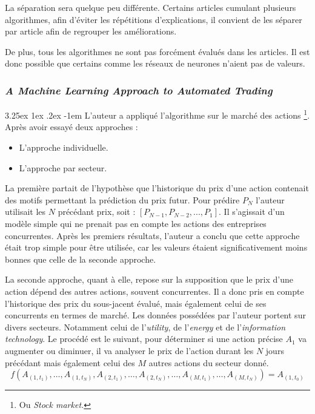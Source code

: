 \documentclass[a4paper, 11pt]{article}
\makeatletter
\newcounter{subsubsubsection}[subsubsection]
\renewcommand\paragraph{\@startsection{paragraph}{5}{\z@}%
  {3.25ex \@plus1ex \@minus.2ex}%
  {-1em}%
  {\normalfont\normalsize\bfseries}}
\makeatother
\begin{document}
La séparation sera quelque peu différente. Certains articles cumulant plusieurs algorithmes, afin d'éviter
les répétitions d'explications, il convient de les séparer par article afin de regrouper les améliorations.

De plus, tous les algorithmes ne sont pas forcément évalués dans les articles. Il est donc possible que certains
comme les réseaux de neurones n'aient pas de valeurs.

\subsubsection{\textit{A Machine Learning Approach to Automated Trading}}

\paragraph{}
L'auteur a appliqué l'algorithme sur le marché des actions \cite{machine_learning_automated_trading}
\footnote{Ou \textit{Stock market.}}. Après avoir essayé deux approches :
\begin{itemize}
\item L'approche individuelle.
\item L'approche par secteur.
\end{itemize}

La première partait de l'hypothèse que l'historique du prix d'une action contenait des motifs permettant la prédiction
du prix futur. Pour prédire $P_N$ l'auteur utilisait les $N$ précédant prix, soit : $[P_{N-1}, P_{N-2},...,P_1]$. Il s'agissait d'un modèle simple qui ne prenait pas en compte les actions des entreprises concurrentes.
Après les premiers résultats, l'auteur a conclu que cette approche
était trop simple pour être utilisée, car les valeurs étaient significativement moins bonnes que celle de la
seconde approche\cite{machine_learning_automated_trading}.

La seconde approche, quant à elle, repose sur la supposition que le prix d'une action dépend des autres actions,
souvent concurrentes. Il a donc pris en compte l'historique des prix du sous-jacent évalué, mais également celui de ses
concurrents en termes de marché. Les données possédées par l'auteur portent sur divers secteurs. Notamment celui
de l'\textit{utility}, de l'\textit{energy} et de l'\textit{information technology}. Le procédé est le suivant,
pour déterminer si une action précise $A_1$ va augmenter ou diminuer, il va analyser le prix de l'action durant les $N$ jours
précédant mais également celui des $M$ autres actions du secteur donné.
$$f(A_{(1,t_1)},\dots, A_{(1,t_N)}, A_{(2,t_1)}, \dots, A_{(2,t_N)}, \dots, A_{(M,t_1)},\dots,A_{(M,t_N)}) = A_{(1,t_0)}$$
\end{document}
